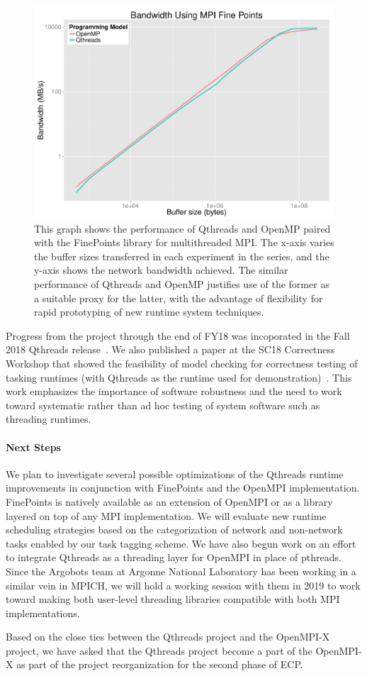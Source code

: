 \begin{figure}[htb]
	\centering
	\includegraphics[width=6in]{projects/2.3.1-PMR/2.3.1.15-Qthreads/FinePointsBW-QtOmp.pdf}
	\caption{\label{fig:qthreads-finepoints-graph}This graph shows the performance of Qthreads and OpenMP paired with the FinePoints library for multithreaded MPI.  The x-axis varies the buffer sizes transferred in each experiment in the series, and the y-axis shows the network bandwidth achieved.  The similar performance of Qthreads and OpenMP justifies use of the former as a suitable proxy for the latter, with the advantage of flexibility for rapid prototyping of new runtime system techniques.}
\end{figure}

Progress from the project through the end of FY18 was incoporated in the Fall 2018 Qthreads release~\cite{qthreads-github}.  We also published a paper at the SC18 Correctness Workshop that showed the feasibility of model checking for correctness testing of tasking runtimes (with Qthreads as the runtime used for demonstration)~\cite{evans2018qthreads-model}.  This work emphasizes the importance of software robustness and the need to work toward systematic rather than ad hoc testing of system software such as threading runtimes.

\paragraph{Next Steps}

We plan to investigate several possible optimizations of the Qthreads runtime improvements in conjunction with FinePoints and the OpenMPI implementation. FinePoints is natively available as an extension of OpenMPI or as a library layered on top of any MPI implementation. We will evaluate new runtime scheduling strategies based on the categorization of network and non-network tasks enabled by our task tagging scheme. We have also begun work on an effort to integrate Qthreads as a threading layer for OpenMPI in place of pthreads. Since the Argobots team at Argonne National Laboratory has been working in a similar vein in MPICH, we will hold a working session with them in 2019 to work toward making both user-level threading libraries compatible with both MPI implementations.

Based on the close ties between the Qthreads project and the OpenMPI-X project, we have asked that the Qthreads project become a part of the OpenMPI-X as part of the project reorganization for the second phase of ECP.

